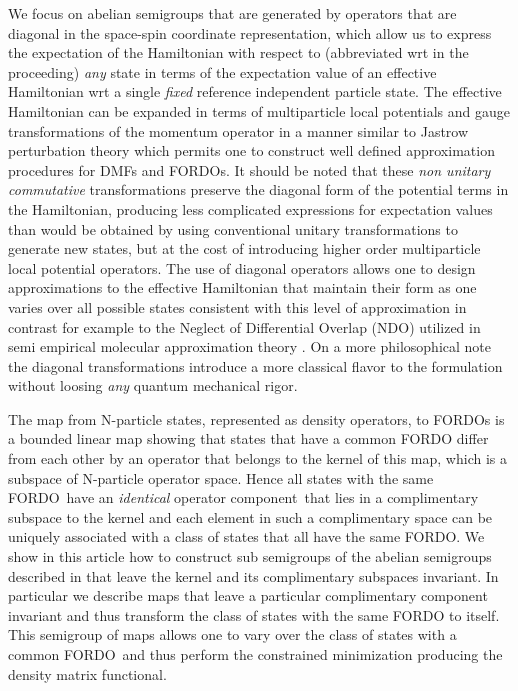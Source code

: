 \documentclass[aps,preprint]{revtex4}%
\begin{document}
We focus on abelian semigroups that are generated by operators that are
diagonal in the space-spin coordinate representation, which allow us to
express the expectation of the Hamiltonian with respect to (abbreviated wrt in
the proceeding) \emph{any} state in terms of the expectation value of an
effective Hamiltonian wrt a single \emph{fixed} reference independent particle
state. The effective Hamiltonian can be expanded in terms of multiparticle
local \cite{local} potentials and gauge transformations of the momentum
operator in a manner similar to Jastrow perturbation theory
\cite{Blazot&Ripka-Jastrow} which permits one to construct well defined
approximation procedures for DMFs and FORDOs. It should be noted that these
\emph{non unitary commutative }transformations preserve the diagonal form of
the potential terms in the Hamiltonian, producing less complicated expressions
for expectation values than would be obtained by using conventional unitary
transformations to generate new states, but at the cost of introducing higher
order multiparticle local potential operators. The use of diagonal operators
allows one to design approximations to the effective Hamiltonian that maintain
their form as one varies over all possible states consistent with this level
of approximation in contrast for example to the Neglect of Differential
Overlap (NDO) utilized in semi empirical molecular approximation theory
\cite{NDO}. On a more philosophical note the diagonal transformations
introduce a more classical flavor to the formulation without loosing
\emph{any} quantum mechanical rigor.

The map from N-particle states, represented as density operators, to FORDOs is
a bounded linear map showing that states that have a common FORDO differ from
each other by an operator that belongs to the kernel of this map, which is a
subspace of N-particle operator space. Hence all states with the same
FORDO\ have an \emph{identical }operator component\emph{\ }that lies in a
complimentary subspace to the kernel and each element in such a complimentary
space can be uniquely associated with a class of states that all have the same
FORDO. We show in this article how to construct sub semigroups of the abelian
semigroups described in \cite{weiner2002} that leave the kernel and its
complimentary subspaces invariant. In particular we describe maps that leave a
particular complimentary component invariant and thus transform the class of
states with the same FORDO to itself. This semigroup of maps allows one to
vary over the class of states with a common FORDO\ and thus perform the
constrained minimization producing the density matrix functional.
\end{document}
